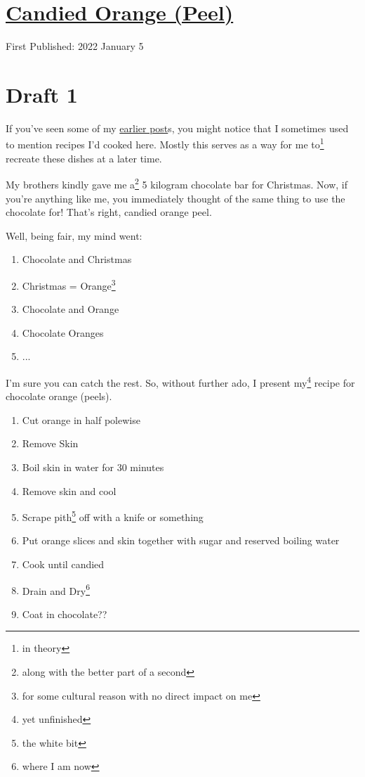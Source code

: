 \documentclass[12pt]{article}[titlepage]
\newcommand{\1}{\={a}}
\newcommand{\2}{\={e}}
\newcommand{\3}{\={\i}}
\newcommand{\4}{\=o}
\newcommand{\5}{\=u}
\newcommand{\6}{\={A}}
\renewcommand{\,}{\textsuperscript{,}}
\begin{document}
\doublespacing
\section{\href{candied-orange.html}{Candied Orange (Peel)}}
First Published: 2022 January 5
\section{Draft 1}
If you've seen some of my \href{boiling-water.html}{earlier post}s, you might notice that I sometimes used to mention recipes I'd cooked here.
Mostly this serves as a way for me to\footnote{in theory} recreate these dishes at a later time.

My brothers kindly gave me a\footnote{along with the better part of a second} 5 kilogram chocolate bar for Christmas.
Now, if you're anything like me, you immediately thought of the same thing to use the chocolate for!
That's right, candied orange peel.

Well, being fair, my mind went:
\begin{enumerate}
\item Chocolate and Christmas
\item Christmas = Orange\footnote{for some cultural reason with no direct impact on me}
\item Chocolate and Orange
\item Chocolate Oranges
\item ...
\end{enumerate}
I'm sure you can catch the rest. So, without further ado, I present my\footnote{yet unfinished} recipe for chocolate orange (peels).

\begin{enumerate}
\item Cut orange in half polewise
\item Remove Skin
\item Boil skin in water for 30 minutes
\item Remove skin and cool
\item Scrape pith\footnote{the white bit} off with a knife or something
\item Put orange slices and skin together with sugar and reserved boiling water
\item Cook until candied
\item Drain and Dry\footnote{where I am now}
\item Coat in chocolate??
\end{enumerate}
\end{document}
